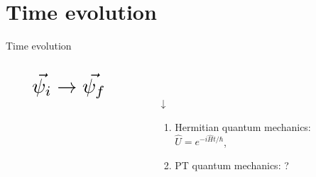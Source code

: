\documentclass[10pt]{beamer}
\newcommand*{\Scale}[2][4]{\scalebox{#1}{\ensuremath{#2}}}%
\begin{document}
\section{Time evolution}
\begin{frame}{Time evolution}
\vspace{-1cm}
\hspace{-2em}
\vspace{2cm}
\begin{columns}[T]
    \begin{column}{0.3\textwidth}
    \vspace{-2cm}
    \begin{align*}
    &\Scale[2]{\vec{\psi_{i}} \rightarrow{} \vec{\psi_{f}}}
    \end{align*}
    \pause
    \hspace{6em}
    \Scale[2.2]{\hookrightarrow}
    \end{column}
    
    \begin{column}{0.8\textwidth}
    \vspace{-1.3cm}
    \Scale[3]{\vec{\psi_{f}} = \hat{U} \vec{\psi_{i}}}\\
    \pause
    \hspace{6.8em}
    \begin{huge}
    {$\downarrow$}\\
    \end{huge}
    \begin{enumerate}
    \item \textcolor{myNewColorA}{Hermitian} quantum mechanics:\\
    \hspace{5em}
    $\hat{U} = e^{-i\hat{H}t / \hbar}$,\\
    \hspace{5em}
    \vspace{0.3cm}
    \pause
    \item \textcolor{myNewColorC}{PT} quantum mechanics: \textcolor{myNewColorC}{\large{?}}
    \end{enumerate}
    \end{column}
    \end{columns}
\end{frame}
\end{document}
